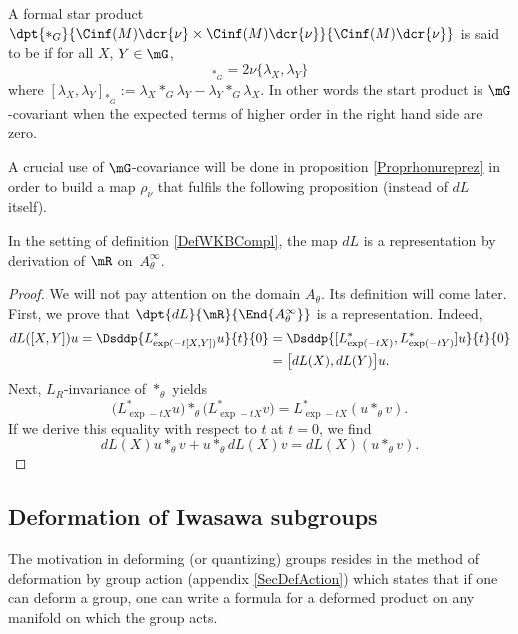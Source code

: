 \begin{definition}
A formal star product $\dpt{\ast_G}{\Cinf(M)\dcr{\nu}\times \Cinf(M)\dcr{\nu}}{\Cinf(M)\dcr{\nu}}$ is said to be  if for all $X$, $Y\in\mG$,
\begin{equation}
[\lambda_X,\lambda_Y]_{\ast_G}=2\nu\{\lambda_X,\lambda_Y\}
\end{equation}
where $[\lambda_{X},\lambda_{Y}]_{\ast_{G}}:=\lambda_X\ast_G\lambda_Y-\lambda_Y\ast_G\lambda_X$. In other words the start product is $\mG$-covariant when the expected terms of higher order in the right hand side are zero. 
\end{definition}

A crucial use of $\mG$-covariance will be done in proposition \ref{Proprhonureprez} in order to build a map $\rho_{\nu}$ that fulfils the following proposition (instead of $dL$ itself). 
\begin{proposition}
In the setting of definition \ref{DefWKBCompl}, the map $dL$ is a representation  by derivation of $\mR$  on~$ A_{\theta}^{\infty}$.
\label{prop:dL_reprez}
\end{proposition}

\begin{proof}
We will not pay attention on the domain $A_{\theta}$. Its definition will come later.  First, we prove that $\dpt{dL}{\mR}{\End{ A_{\theta}^{\infty}}}$ is a representation. Indeed,
\begin{equation}
\begin{split}
  dL([X,Y])u=\Dsddp{L^*_{\exp(-t[X,Y])}u}{t}{0}
            &=\Dsddp{ [ L^*_{\exp(-tX)},L^*_{\exp(-tY)}  ] u}{t}{0}\\
	    &=\big[dL(X),dL(Y)\big]u.
\end{split}
\end{equation}
Next, $L_R$-invariance of $\ast_{\theta}$ yields 
\[ 
  \big( L^*_{\exp -tX}u \big)\ast_{\theta}\big( L^*_{\exp -tX}v \big)=L^*_{\exp -tX}(u\ast_{\theta} v).
\]
If we derive this equality with respect to $t$ at $t=0$, we find
\[
   dL(X)u\ast_{\theta} v+u\ast_{\theta} dL(X)v=dL(X)(u\ast_{\theta} v).
\]
\end{proof}


\subsection{Deformation of Iwasawa subgroups}	%

The motivation in deforming (or quantizing) groups resides in the method of deformation by group action (appendix \ref{SecDefAction}) which states that if one can deform a group, one can write a formula for a deformed product on any manifold on which the group acts.

